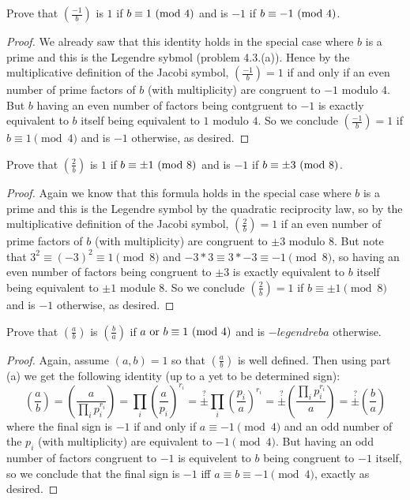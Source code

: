 \documentclass[11pt]{article}
\newcommand{\legendre}[2]{\genfrac{(}{)}{}{}{#1}{#2}}
\begin{document}
Prove that $\legendre{-1}{b}$ is $1$ if $b \equiv 1\ (\text{mod}\ 4)$ and is $-1$ if $b \equiv -1\ (\text{mod}\ 4)$.
\begin{proof}
  We already saw that this identity holds in the special case where $b$ is a prime and this is the Legendre sybmol (problem 4.3.(a)).
  Hence by the multiplicative definition of the Jacobi symbol, $\legendre{-1}{b} = 1$ if and only if an even number of prime factors of $b$ (with multiplicity) are congruent to $-1$ modulo $4$.
  But $b$ having an even number of factors being contgruent to $-1$ is exactly equivalent to $b$ itself being equivalent to $1$ modulo $4$.
  So we conclude $\legendre{-1}{b} = 1$ if $b \equiv 1 \pmod 4$ and is $-1$ otherwise, as desired.
\end{proof}

Prove that $\legendre{2}{b}$ is $1$ if $b \equiv \pm 1\ (\text{mod}\ 8)$ and is $-1$ if $b \equiv \pm 3\ (\text{mod}\ 8)$.
\begin{proof}
  Again we know that this formula holds in the special case where $b$ is a prime and this is the Legendre symbol by the quadratic reciprocity law, so by the multiplicative definition of the Jacobi symbol, $\legendre{2}{b} = 1$ if an even number of prime factors of $b$ (with multiplicity) are congruent to $\pm 3$ modulo $8$.
  But note that $3^2 \equiv (-3)^2 \equiv 1 \pmod 8$ and $-3 * 3 \equiv 3 * -3 \equiv -1 \pmod 8$, so having an even number of factors being congruent to $\pm 3$ is exactly equivalent to $b$ itself being equivalent to $\pm 1$ module $8$.
  So we conclude $\legendre{2}{b} = 1$ if $b \equiv \pm 1 \pmod 8$ and is $-1$ otherwise, as desired.
\end{proof}

Prove that $\legendre{a}{b}$ is $\legendre{b}{a}$ if $a \text{ or } b \equiv 1\ (\text{mod}\ 4)$ and is $-legendre{b}{a}$ otherwise.
\begin{proof}
  Again, assume $(a,b) = 1$ so that $\legendre{a}{b}$ is well defined. Then using part (a) we get the following identity (up to a yet to be determined sign):
  \begin{equation*}
    \legendre{a}{b} = \legendre{a}{\prod_i p_i^{r_i}}
    = \prod_i \legendre{a}{p_i}^{r_i}
    = \stackrel{?}{\pm} \prod_i \legendre{p_i}{a}^{r_i}
    = \stackrel{?}{\pm} \legendre{\prod_i p_i^{r_i}}{a}
    = \stackrel{?}{\pm} \legendre{b}{a}
  \end{equation*}
  where the final sign is $-1$ if and only if $a \equiv -1 \pmod 4$ and an odd number of the $p_i$ (with multiplicity) are equivalent to $-1 \pmod 4$.
  But having an odd number of factors congruent to $-1$ is equivelent to $b$ being congruent to $-1$ itself, so we conclude that the final sign is $-1$ iff $a \equiv b \equiv -1 \pmod 4$, exactly as desired. 
\end{proof}
\end{document}
